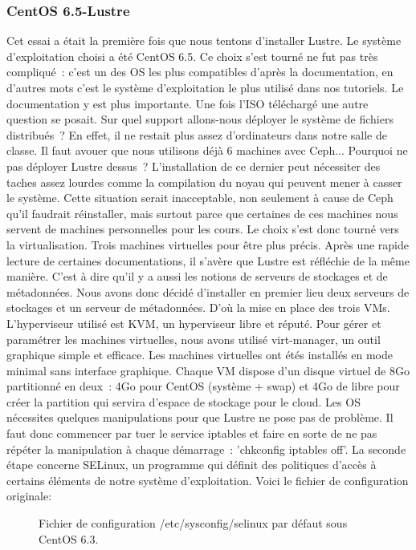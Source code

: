 \documentclass[12pt]{article}
\begin{document}
\subsubsection{CentOS 6.5-Lustre}
Cet essai a était la première fois que nous tentons d’installer Lustre. Le système d'exploitation choisi a été CentOS 6.5. Ce choix s'est tourné ne fut pas très compliqué : c'est un des OS les plus compatibles d'après la documentation, en d'autres mots c'est le système d'exploitation le plus utilisé dans nos tutoriels. Le documentation y est plus importante. Une fois l'ISO téléchargé une autre question se posait. Sur quel support allons-nous déployer le système de fichiers distribués ? En effet, il ne restait plus assez d'ordinateurs dans notre salle de classe. Il faut avouer que nous utilisons déjà 6 machines avec Ceph... Pourquoi ne pas déployer Lustre dessus ? L'installation de ce dernier peut nécessiter des taches assez lourdes comme la compilation du noyau qui peuvent mener à casser le système. Cette situation serait inacceptable, non seulement à cause de Ceph qu'il faudrait réinstaller, mais surtout parce que certaines de ces machines nous servent de machines personnelles pour les cours. Le choix s'est donc tourné vers la virtualisation. Trois machines virtuelles pour être plus précis. Après une rapide lecture de certaines documentations, il s'avère que Lustre est réfléchie de la même manière. C'est à dire qu'il y a aussi les notions de serveurs de stockages et de métadonnées. Nous avons donc décidé d'installer en premier lieu deux serveurs de stockages et un serveur de métadonnées. D'où la mise en place des trois VMs. L'hyperviseur utilisé est KVM, un hyperviseur libre et réputé. Pour gérer et paramétrer les machines virtuelles, nous avons utilisé virt-manager, un outil graphique simple et efficace. Les machines virtuelles ont étés installés en mode minimal sans interface graphique. Chaque VM dispose d'un disque virtuel de 8Go partitionné en deux : 4Go pour CentOS (système + swap) et 4Go de libre pour créer la partition qui servira d'espace de stockage pour le cloud. Les OS nécessites quelques manipulations pour que Lustre ne pose pas de problème. Il faut donc commencer par tuer le service iptables et faire en sorte de ne pas répéter la manipulation à chaque démarrage : 'chkconfig iptables off'. La seconde étape concerne SELinux, un programme qui définit des politiques d'accès à certains éléments de notre système d'exploitation. Voici le fichier de configuration originale:

\begin{figure}[H]
\caption{Fichier de configuration /etc/sysconfig/selinux par défaut sous CentOS 6.3.}
\label{fig:identification}
\end{figure}
\end{document}
